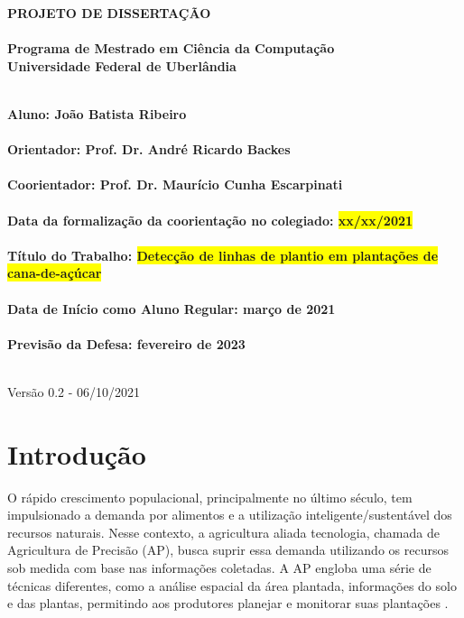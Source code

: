 \documentclass[12pt, a4paper, english, brazil]{article}
\newcommand{\textRed}[1]{{{\color{red} #1}}}
\begin{document}
\rhead{\thepage}

\begin{center}
	\bf{\LARGE{PROJETO DE DISSERTAÇÃO}\\ $\ $\\}
	\Large{Programa de Mestrado em Ciência da Computação\\
		Universidade Federal de Uberlândia}\\ $\ $\\
\end{center}

\begin{center}
	\bf{Aluno: João Batista Ribeiro\\ $\ $\\
		Orientador: Prof. Dr. André Ricardo Backes\\ $\ $\\
		Coorientador: Prof. Dr. Maurício Cunha Escarpinati\\ $\ $\\
		Data da formalização da coorientação no colegiado: \colorbox{yellow}{xx/xx/2021}\\ $\ $\\
		Título do Trabalho: \colorbox{yellow}{Detecção de linhas de plantio em plantações de cana-de-açúcar}\\ $\ $\\
		Data de Início como Aluno Regular: março de 2021\\ $\ $\\
		Previsão da Defesa: fevereiro de 2023\\ $\ $\\}
\end{center}

\textRed{Versão 0.2 - 06/10/2021}

\section{Introdução}

O rápido crescimento populacional, principalmente no último século, tem impulsionado a demanda por alimentos e a utilização inteligente/sustentável dos recursos naturais. Nesse contexto, a agricultura aliada tecnologia, chamada de Agricultura de Precisão (AP), busca suprir essa demanda utilizando os recursos sob medida com base nas informações coletadas. A AP engloba uma série de técnicas diferentes, como a análise espacial da área plantada, informações do solo e das plantas, permitindo aos produtores planejar e monitorar suas plantações \cite{Blasch_2020}.
\end{document}
